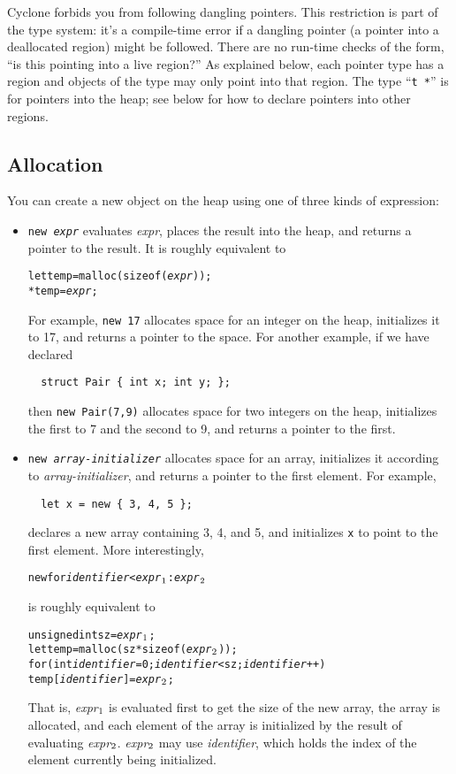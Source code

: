 Cyclone forbids you from following dangling pointers.  This
restriction is part of the type system: it's a compile-time error if a
dangling pointer (a pointer into a deallocated region) might be
followed.  There are no run-time checks of the form, ``is this
pointing into a live region?''  As explained below, each pointer type
has a region and objects of the type may only point into that region.
The type ``\texttt{t *}'' is for pointers into the heap; see below for
how to declare pointers into other regions.

\subsection{Allocation}
You can create a new object on the heap using one of three kinds of
expression: 
\begin{itemize}
\item \texttt{new {\it expr}} evaluates \textit{expr}, places the
  result into the heap, and returns a pointer to the result.  It is
  roughly equivalent to
\begin{alltt}
  let temp = malloc(sizeof({\it expr}));
  *temp = {\it expr};
\end{alltt}
  For example, \texttt{new 17} allocates space for an integer on the
  heap, initializes it to 17, and returns a pointer to the space.  For
  another example, if we have declared
\begin{verbatim}
  struct Pair { int x; int y; };
\end{verbatim}
  then \texttt{new Pair(7,9)} allocates space for two integers on the
  heap, initializes the first to 7 and the second to 9, and returns a
  pointer to the first.

\item \texttt{new {\it array-initializer}} allocates space for an
  array, initializes it according to \textit{array-initializer}, and
  returns a pointer to the first element.  For example,
\begin{verbatim}
  let x = new { 3, 4, 5 };
\end{verbatim}
  declares a new array containing 3, 4, and 5, and initializes
  \texttt{x} to point to the first element.  More interestingly,
\begin{alltt}
  new \lb for {\it identifier} < {\it expr}\(\sb{1}\) : {\it expr}\(\sb{2}\) \rb
\end{alltt}
  is roughly equivalent to
\begin{alltt}
  unsigned int sz = {\it expr}\(\sb{1}\);
  let temp = malloc(sz * sizeof({\it expr}\(\sb{2}\)));
  for (int {\it identifier} = 0; {\it identifier} < sz; {\it identifier}++)
    temp[{\it identifier}] = {\it expr}\(\sb{2}\);
\end{alltt}
  That is, 
  {\it expr}\(\sb{1}\)
  is evaluated first to get the size of the new array,
  the array is allocated, and each element of the array is
  initialized by the result of evaluating
  {\it expr}\(\sb{2}\).
  {\it expr}\(\sb{2}\) may use {\it identifier}, which 
  holds the index of the element currently being initialized.
  

\end{itemize}

